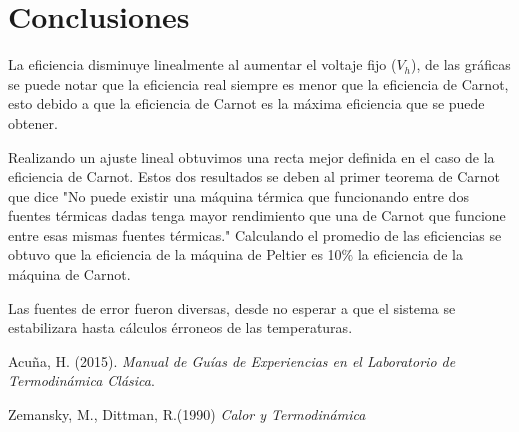 \documentclass[12pt]{article}
\begin{document}
\section{Conclusiones}
La eficiencia disminuye linealmente al aumentar el voltaje fijo ($V_h$), de las gráficas se puede notar que la eficiencia real siempre es menor que la eficiencia de Carnot, esto debido a que la eficiencia de Carnot es la máxima eficiencia que se puede obtener. 

Realizando un ajuste lineal obtuvimos una recta mejor definida en el caso de la eficiencia de Carnot.
Estos dos resultados se deben al primer teorema de Carnot que dice "No puede existir una máquina térmica que funcionando entre dos fuentes térmicas dadas tenga mayor rendimiento que una de Carnot que funcione entre esas mismas fuentes térmicas." 
Calculando el promedio de las eficiencias se obtuvo que la eficiencia de la máquina de Peltier es 10$\%$ la eficiencia de la máquina de Carnot.

Las fuentes de error fueron diversas, desde no esperar a que el sistema se estabilizara hasta cálculos érroneos de las temperaturas.


\begin{thebibliography}{6}


Acuña, H. (2015). \textit{Manual de Guías de Experiencias en el Laboratorio de Termodinámica Clásica}.

Zemansky, M., Dittman, R.(1990) \textit{Calor y Termodinámica}


\end{thebibliography}
\end{document}
